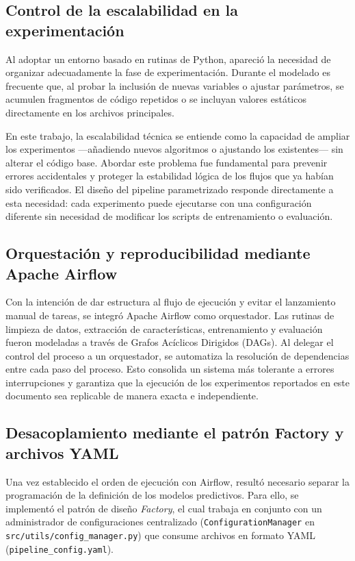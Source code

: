 \subsection{Control de la escalabilidad en la experimentación}

Al adoptar un entorno basado en rutinas de Python, apareció la necesidad de organizar adecuadamente la fase de experimentación. Durante el modelado es frecuente que, al probar la inclusión de nuevas variables o ajustar parámetros, se acumulen fragmentos de código repetidos o se incluyan valores estáticos directamente en los archivos principales.

En este trabajo, la escalabilidad técnica se entiende como la capacidad de ampliar los experimentos —añadiendo nuevos algoritmos o ajustando los existentes— sin alterar el código base. Abordar este problema fue fundamental para prevenir errores accidentales y proteger la estabilidad lógica de los flujos que ya habían sido verificados. El diseño del pipeline parametrizado responde directamente a esta necesidad: cada experimento puede ejecutarse con una configuración diferente sin necesidad de modificar los scripts de entrenamiento o evaluación.

\subsection{Orquestación y reproducibilidad mediante Apache Airflow}

Con la intención de dar estructura al flujo de ejecución y evitar el lanzamiento manual de tareas, se integró Apache Airflow como orquestador. Las rutinas de limpieza de datos, extracción de características, entrenamiento y evaluación fueron modeladas a través de Grafos Acíclicos Dirigidos (DAGs). Al delegar el control del proceso a un orquestador, se automatiza la resolución de dependencias entre cada paso del proceso. Esto consolida un sistema más tolerante a errores interrupciones y garantiza que la ejecución de los experimentos reportados en este documento sea replicable de manera exacta e independiente.

\subsection{Desacoplamiento mediante el patrón Factory y archivos YAML}

Una vez establecido el orden de ejecución con Airflow, resultó necesario separar la programación de la definición de los modelos predictivos. Para ello, se implementó el patrón de diseño \textit{Factory}, el cual trabaja en conjunto con un administrador de configuraciones centralizado (\texttt{ConfigurationManager} en \texttt{src/utils/config\_manager.py}) que consume archivos en formato YAML (\texttt{pipeline\_config.yaml}).

